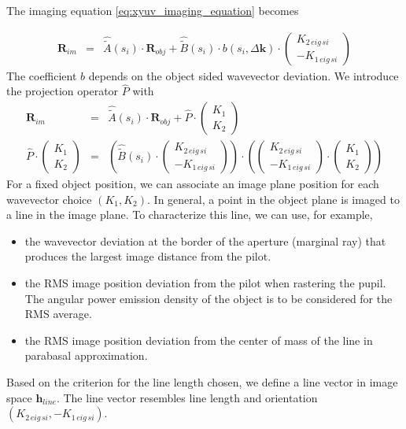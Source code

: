 \documentclass[12pt,a4paper,twoside,openright,BCOR10mm,headsepline,titlepage,abstracton,chapterprefix,final]{scrreprt}
\newcommand\Vector[1]{{\mathbf{#1}}}
\newcommand\wavenumber{k}
\newcommand\Wavevector{\Vector{\wavenumber}}
\begin{document}
The imaging equation \eqref{eq:xyuv_imaging_equation} becomes

\begin{eqnarray}
 \Vector{R}_{im} &=& \hat{\tilde{A}}(s_i) \cdot \Vector{R}_{obj} + \hat{\tilde{B}}(s_i) \cdot b(s_i,\Delta\Wavevector) \cdot \begin{pmatrix} K_{2\,eig\,si} \\ - K_{1\,eig\,si} \end{pmatrix}
\end{eqnarray}
The coefficient $b$ depends on the object sided wavevector deviation.
We introduce the projection operator $\hat{P}$ with
\begin{eqnarray}
 \Vector{R}_{im} &=& \hat{\tilde{A}}(s_i) \cdot \Vector{R}_{obj} + \hat{P} \cdot \begin{pmatrix} K_{1} \\ K_{2} \end{pmatrix} \\
 \hat{P} \cdot \begin{pmatrix} K_{1} \\ K_{2} \end{pmatrix} &=& 
    \left( \hat{\tilde{B}}(s_i) \cdot \begin{pmatrix} K_{2\,eig\,si} \\ - K_{1\,eig\,si} \end{pmatrix} \right) 
    \cdot
    \left( \begin{pmatrix} K_{2\,eig\,si} \\ - K_{1\,eig\,si} \end{pmatrix} \cdot \begin{pmatrix} K_{1} \\ K_{2} \end{pmatrix} \right)
\end{eqnarray}
For a fixed object position, we can associate an image plane position for each wavevector choice $(K_1,K_2)$.
In general, a point in the object plane is imaged to a line in the image plane.
To characterize this line, we can use, for example,
\begin{itemize}
 \item the wavevector deviation at the border of the aperture (marginal ray) that produces the largest image distance from the pilot.
 \item the RMS image position deviation from the pilot when rastering the pupil.
       The angular power emission density of the object is to be considered for the RMS average.
 \item the RMS image position deviation from the center of mass of the line in parabasal approximation.
\end{itemize}
Based on the criterion for the line length chosen, we define a line vector in image space $\Vector{h}_{line}$.
The line vector resembles line length and orientation $( K_{2\,eig\,si}, - K_{1\,eig\,si} )$.
\end{document}
